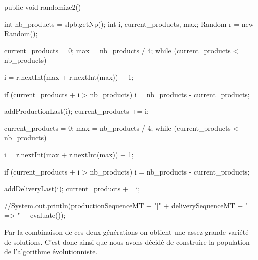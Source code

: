 \begin{java}
public void randomize2() {
	int nb_products = slpb.getNp();
	int i, current_products, max;
	Random r = new Random();
	
	current_products = 0;
	max = nb_products / 4;
	while (current_products < nb_products) {
		i = r.nextInt(max + r.nextInt(max)) + 1;
		
		if (current_products + i > nb_products) {
			i = nb_products - current_products;
		}
		
		addProductionLast(i);
		current_products += i;
	}
	
	current_products = 0;
	max = nb_products / 4;
	while (current_products < nb_products) {
		i = r.nextInt(max + r.nextInt(max)) + 1;
		
		if (current_products + i > nb_products) {
			i = nb_products - current_products;
		}
		
		addDeliveryLast(i);
		current_products += i;
	}
	
	//System.out.println(productionSequenceMT + "|" + deliverySequenceMT + " => " + evaluate());
}

\end{java}
\vspace{1em}
Par la combinaison de ces deux générations on obtient une assez grande variété de solutions. C'est donc ainsi que nous avons décidé de construire la population de l'algorithme évolutionniste.